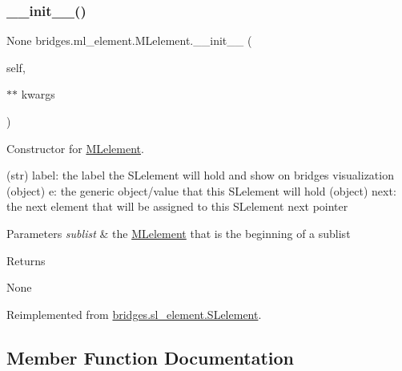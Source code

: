 \subsubsection{\texorpdfstring{\_\_init\_\_()}{\_\_init\_\_()}}
{\footnotesize\ttfamily  None bridges.\+ml\+\_\+element.\+M\+Lelement.\+\_\+\+\_\+init\+\_\+\+\_\+ (\begin{DoxyParamCaption}\item[{}]{self,  }\item[{$\ast$$\ast$}]{kwargs }\end{DoxyParamCaption})}



Constructor for \mbox{\hyperlink{classbridges_1_1ml__element_1_1_m_lelement}{M\+Lelement}}. 

\begin{DoxyVerb}       (str) label: the label the SLelement will hold and show on bridges visualization
       (object) e: the generic object/value that this SLelement will hold
       (object) next: the next element that will be assigned to this SLelement next pointer
\end{DoxyVerb}
 
\begin{DoxyParams}{Parameters}
{\em sublist} & the \mbox{\hyperlink{classbridges_1_1ml__element_1_1_m_lelement}{M\+Lelement}} that is the beginning of a sublist \\
\hline
\end{DoxyParams}
\begin{DoxyReturn}{Returns}


None 
\end{DoxyReturn}


Reimplemented from \mbox{\hyperlink{classbridges_1_1sl__element_1_1_s_lelement_a0824caaa305931953bf3f6d53d3a3d14}{bridges.\+sl\+\_\+element.\+S\+Lelement}}.



\subsection{Member Function Documentation}
\mbox{\label{classbridges_1_1ml__element_1_1_m_lelement_a962980c5497d59fb7cab10408c9c46f2}} 
